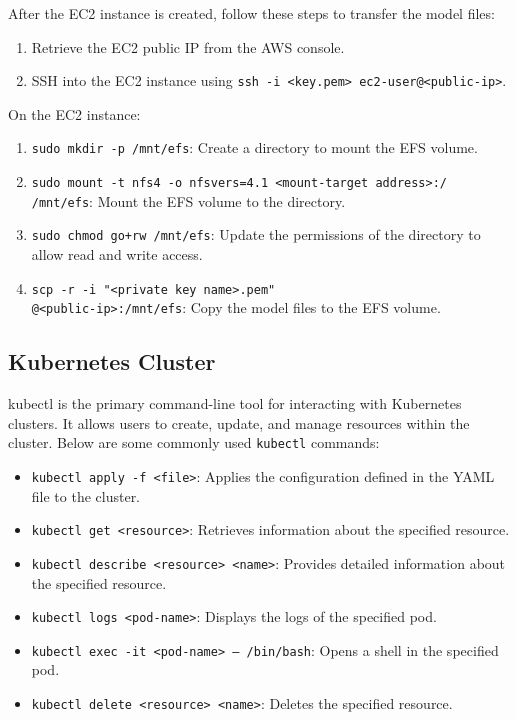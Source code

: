 After the EC2 instance is created, follow these steps to transfer the model files:

\begin{enumerate}
    \item Retrieve the EC2 public IP from the AWS console.
    \item SSH into the EC2 instance using \texttt{ssh -i <key.pem> ec2-user@<public-ip>}.
\end{enumerate}

On the EC2 instance:
\begin{enumerate}
    \item \texttt{sudo mkdir -p /mnt/efs}: Create a directory to mount the EFS volume.
    \item 
        \begin{sloppypar}
            \texttt{sudo mount -t nfs4 -o nfsvers=4.1 <mount-target address>:/ /mnt/efs}: Mount the EFS volume to the directory.
        \end{sloppypar}
    \item \texttt{sudo chmod go+rw /mnt/efs}: Update the permissions of the directory to allow read and write access.

    \item 
        \begin{sloppypar}
            \texttt{scp -r -i "<private key name>.pem" \\<model-directory>@<public-ip>:/mnt/efs}: Copy the model files to the EFS volume.
        \end{sloppypar}
\end{enumerate}

\subsection{Kubernetes Cluster}
kubectl is the primary command-line tool for interacting with Kubernetes clusters. It allows users to create, update, and manage resources within the cluster. Below are some commonly used \texttt{kubectl} commands:

\begin{itemize}
    \item \texttt{kubectl apply -f <file>}: Applies the configuration defined in the YAML file to the cluster.
    \item \texttt{kubectl get <resource>}: Retrieves information about the specified resource.
    \item \texttt{kubectl describe <resource> <name>}: Provides detailed information about the specified resource.
    \item \texttt{kubectl logs <pod-name>}: Displays the logs of the specified pod.
    \item \texttt{kubectl exec -it <pod-name> -- /bin/bash}: Opens a shell in the specified pod.
    \item \texttt{kubectl delete <resource> <name>}: Deletes the specified resource.
\end{itemize}

